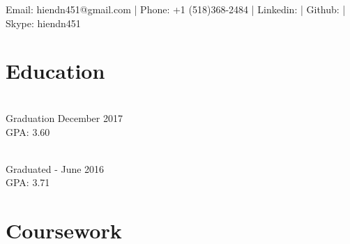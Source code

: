 \documentclass[]{deedy_format_Hien}
\begin{document}
%
%
\lastupdated

%
%


{Email: hiendn451@gmail.com | Phone: +1 (518)368-2484 | Linkedin: \href{https://www.linkedin.com/in/hien-nguyen-5567149a}{} | Github: \href{https://github.com/nguyenduchien1994}{} | Skype: hiendn451
}

%
%

\begin{minipage}[t]{0.325\textwidth} 


\section{Education} 
\vspace{2mm} %
\\
Graduation December 2017 \\ GPA: 3.60
\sectionsep

\\		
Graduated - June 2016 \\ GPA: 3.71
\sectionsep


\section{Coursework}
\vspace{2mm} %
\flushleft

\end{minipage}
\end{document}
